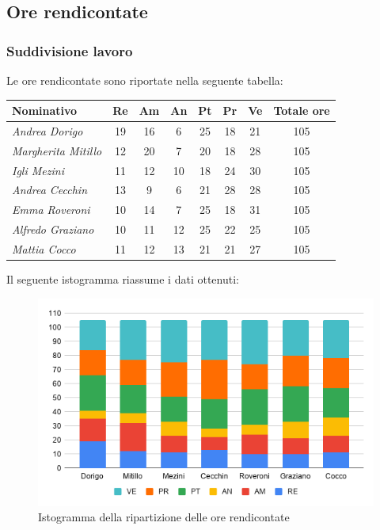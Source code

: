 {{{{{{{{{{{{\subsection{Ore rendicontate}\label{PreventivoRiepilogoOreRendicontate}

\subsubsection{Suddivisione lavoro}\label{PreventivoRiepilogoOreRendicontateSuddivisioneLavoro}
Le ore rendicontate sono riportate nella seguente tabella:
\quad
\def\tabularxcolumn#1{m{#1}}
{
	
	\begin{center}
		\renewcommand{\arraystretch}{1.4}
		\begin{tabularx}{\textwidth}{|X|c|c|c|c|c|c|c|}
			\hline
			\rowcolor{airforceblue}
			\textbf{Nominativo} & \textbf{Re} & \textbf{Am} & \textbf{An} & \textbf{Pt} & \textbf{Pr} & \textbf{Ve} & \textbf{Totale ore}\\
			\hline
			\textit{Andrea Dorigo} & 19 & 16 & 6 & 25 & 18 & 21 & 105\\
			\hline
			\textit{Margherita Mitillo} & 12 & 20 & 7 & 20 & 18 & 28 & 105\\
			\hline
			\textit{Igli Mezini} & 11 & 12 & 10 & 18 & 24 & 30 & 105\\
			\hline
			\textit{Andrea Cecchin} & 13 & 9 & 6 & 21 & 28 & 28 & 105\\
			\hline
			\textit{Emma Roveroni} & 10 & 14 & 7 & 25 & 18 & 31 & 105\\
			\hline
			\textit{Alfredo Graziano} & 10 & 11 & 12 & 25 & 22 & 25 & 105\\
			\hline
			\textit{Mattia Cocco} & 11 & 12 & 13 & 21 & 21 & 27 & 105\\
			\hline
		\end{tabularx}
	\end{center}
Il seguente istogramma riassume i dati ottenuti:
\begin{figure}[!ht]
	\begin{center}
		\includegraphics[width=0.8\linewidth]{../immagini/pdp/istogramma_rendicontate.png}
		\caption{Istogramma della ripartizione delle ore rendicontate}
	\end{center}
\end{figure}

}}}}}}}}}}}}}

